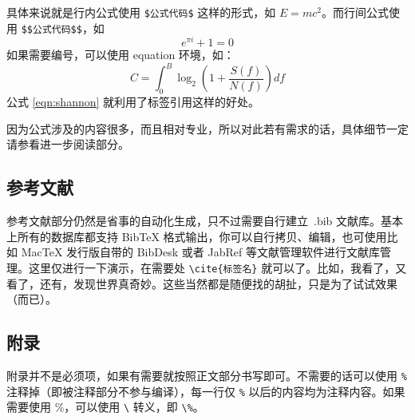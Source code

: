 具体来说就是行内公式使用 \verb|$公式代码$| 这样的形式，如 $E=mc^2$。而行间公式使用 \verb|$$公式代码$$|，如
$$e^{\pi i}+1=0$$
如果需要编号，可以使用 equation 环境，如：
\begin{equation}
	C=\int^B_0\log_2(1+\frac{S(f)}{N(f)})df
	\label{eqn:shannon}
\end{equation}
公式 \eqref{eqn:shannon} 就利用了标签引用这样的好处。

因为公式涉及的内容很多，而且相对专业，所以对此若有需求的话，具体细节一定请参看进一步阅读部分。

\subsection{参考文献}
参考文献部分仍然是省事的自动化生成，只不过需要自行建立~.bib 文献库。基本上所有的数据库都支持 BibTeX 格式输出，你可以自行拷贝、编辑，也可使用比如 MacTeX 发行版自带的 BibDesk 或者 JabRef 等文献管理软件进行文献库管理。这里仅进行一下演示，在需要处 \verb|\cite{标签名}| 就可以了。比如，我看了\cite{ref1}，又看了\cite{ref2}，还有\cite{ref3,ref4}，发现世界真奇妙\cite{ref3}。这些当然都是随便找的胡扯，只是为了试试效果（而已）。

\subsection{附录}
附录并不是必须项，如果有需要就按照正文部分书写即可。不需要的话可以使用 \verb|%| 注释掉（即被注释部分不参与编译），每一行仅 \verb|%| 以后的内容均为注释内容。如果需要使用 \%，可以使用 \verb|\| 转义，即 \verb|\%|。
